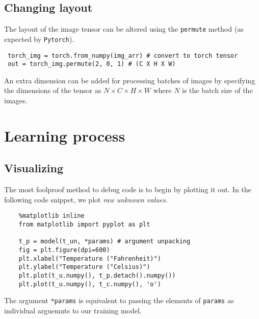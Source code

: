 \documentclass[11pt]{article}
\begin{document}
\subsection{Changing layout}
\label{sec:org036d78a}
The layout of the image tensor can be altered using the \texttt{permute} method (as expected by \texttt{Pytorch}).
\begin{verbatim}
 torch_img = torch.from_numpy(img_arr) # convert to torch tensor
 out = torch_img.permute(2, 0, 1) # (C X H X W)
\end{verbatim}
An extra dimension can be added for processing batches of images by specifying the dimensions of the tensor as \(N\times C\times H\times W\) where \(N\) is the batch size of the images.

\section{Learning process}
\label{sec:orgc8d1684}
\subsection{Visualizing}
\label{sec:orgdc8553c}
The most foolproof method to debug code is to begin by plotting it out. In the following code snippet, we plot \emph{raw unknown values}.
\begin{verbatim}
    %matplotlib inline
    from matplotlib import pyplot as plt

    t_p = model(t_un, *params) # argument unpacking
    fig = plt.figure(dpi=600)
    plt.xlabel("Temperature (°Fahrenheit)")
    plt.ylabel("Temperature (°Celsius)")
    plt.plot(t_u.numpy(), t_p.detach().numpy())
    plt.plot(t_u.numpy(), t_c.numpy(), 'o')
\end{verbatim}
The argument \texttt{*params} is equivalent to passing the elements of \texttt{params} as individual arguemnts to our training model.
\end{document}
